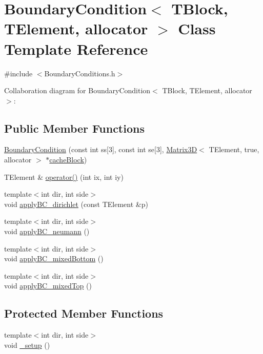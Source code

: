 \hypertarget{class_boundary_condition}{}\section{Boundary\+Condition$<$ T\+Block, T\+Element, allocator $>$ Class Template Reference}
\label{class_boundary_condition}


{\ttfamily \#include $<$Boundary\+Conditions.\+h$>$}



Collaboration diagram for Boundary\+Condition$<$ T\+Block, T\+Element, allocator $>$\+:
\subsection*{Public Member Functions}
\begin{DoxyCompactItemize}
\item 
\hyperlink{class_boundary_condition_a89cbd322bff8127af5a49685e3bf04ce}{Boundary\+Condition} (const int ss\mbox{[}3\mbox{]}, const int se\mbox{[}3\mbox{]}, \hyperlink{class_matrix3_d}{Matrix3\+D}$<$ T\+Element, true, allocator $>$ $\ast$\hyperlink{class_boundary_condition_a1e0c33fa794a6d333d4451f8fde04c29}{cache\+Block})
\item 
T\+Element \& \hyperlink{class_boundary_condition_aadcfe05da7761b68191835b09d4d2cf0}{operator()} (int ix, int iy)
\item 
{\footnotesize template$<$int dir, int side$>$ }\\void \hyperlink{class_boundary_condition_adadad3f69ee5cf8ab11dc8f8a7763a4f}{apply\+B\+C\+\_\+dirichlet} (const T\+Element \&p)
\item 
{\footnotesize template$<$int dir, int side$>$ }\\void \hyperlink{class_boundary_condition_a101992951fb756135ca3e44f5d64bb60}{apply\+B\+C\+\_\+neumann} ()
\item 
{\footnotesize template$<$int dir, int side$>$ }\\void \hyperlink{class_boundary_condition_a60e154d33104f42e29dfa49061b266f6}{apply\+B\+C\+\_\+mixed\+Bottom} ()
\item 
{\footnotesize template$<$int dir, int side$>$ }\\void \hyperlink{class_boundary_condition_a77cf65bd542d198d80aa54a3de632ff5}{apply\+B\+C\+\_\+mixed\+Top} ()
\end{DoxyCompactItemize}
\subsection*{Protected Member Functions}
\begin{DoxyCompactItemize}
\item 
{\footnotesize template$<$int dir, int side$>$ }\\void \hyperlink{class_boundary_condition_af8969c6c584388f44cf464a8021d125a}{\+\_\+setup} ()
\end{DoxyCompactItemize}
